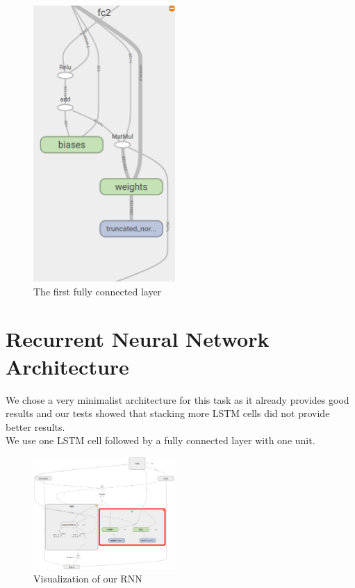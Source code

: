 \documentclass[twoside, twocolumn]{article}
\begin{document}
\begin{figure}[htb]
\centering
	\includegraphics[width=0.48\textwidth]{fc_layer.png}
	\caption{The first fully connected layer}
\end{figure}





\section{Recurrent Neural Network Architecture}
We chose a very minimalist architecture for this task as it already provides good results and our tests showed that stacking more LSTM cells did not provide better results. \\
We use one LSTM cell followed by a fully connected layer with one unit.

\begin{figure}[htb]
\centering
	\includegraphics[width=0.48\textwidth]{rnn.png}
	\caption{Visualization of our RNN}
\end{figure}
\end{document}
